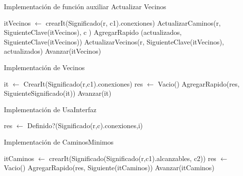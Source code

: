 \begin{Algoritmos}
				
\begin{algorithm}
\caption{Implementaci\'on de funci\'on auxiliar Actualizar Vecinos}
\begin{algorithmic}[0]
\State itVecinos $\gets$ crearIt(Significado(r, c1).conexiones)
		\State ActualizarCaminos(r, SiguienteClave(itVecinos), c )
		\State AgregarRapido (actualizados, SiguienteClave(itVecinos))
		\State ActualizarVecinos(r, SiguienteClave(itVecinos), actualizados)
	\EndIf
\State Avanzar(itVecinos)
\EndWhile
\EndFunction
\end{algorithmic}
\end{algorithm}

\begin{algorithm}
\caption{Implementaci\'on de Vecinos}
\begin{algorithmic}[0]
	\State it $\gets$ CrearIt(Significado(r,c1).conexiones) 
	\State res $\gets$ Vacio()  
	   
		\State AgregarRapido(res, SiguienteSignificado(it)) 
		\State Avanzar(it) 
	\EndWhile
\EndFunction {}
\end{algorithmic}
\end{algorithm}

\begin{algorithm}
\caption{Implementaci\'on de UsaInterfaz}
\begin{algorithmic}[0]
	\State res $\gets$ Definido?(Significado(r,c).conexiones,i) 
\EndFunction {}
\end{algorithmic}
\end{algorithm}

\begin{algorithm}
\caption{Implementaci\'on de CaminosMinimos}
\begin{algorithmic}[0]
	\State itCaminos $\gets$ crearIt(Significado(Significado(r,c1).alcanzables, c2)) 
	\State res $\gets$ Vacio()  
		\State AgregarRapido(res, Siguiente(itCaminos)) 
		\State Avanzar(itCaminos) 	
	\EndWhile
\EndFunction {}
\end{algorithmic}
\end{algorithm}


\end{Algoritmos}
